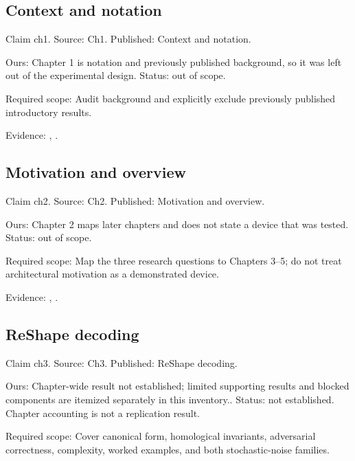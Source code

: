 \subsection{Context and notation}\label{claim:ch1}
Claim ch1. Source: Ch1. Published: Context and notation.

Ours: Chapter 1 is notation and previously published background, so it was left out of the experimental design. Status: out of scope.

Required scope: Audit background and explicitly exclude previously published introductory results.

Evidence: \href{https://github.com/alectionary/vibe-math/blob/master/formalization/quintavalle-hgp/sources/browser-extraction.txt}{}, \href{https://github.com/alectionary/vibe-math/blob/master/formalization/quintavalle-hgp/availability.md}{}.
\subsection{Motivation and overview}\label{claim:ch2}
Claim ch2. Source: Ch2. Published: Motivation and overview.

Ours: Chapter 2 maps later chapters and does not state a device that was tested. Status: out of scope.

Required scope: Map the three research questions to Chapters 3--5; do not treat architectural motivation as a demonstrated device.

Evidence: \href{https://github.com/alectionary/vibe-math/blob/master/formalization/quintavalle-hgp/sources/browser-extraction.txt}{}, \href{https://github.com/alectionary/vibe-math/blob/master/formalization/quintavalle-hgp/availability.md}{}.
\subsection{ReShape decoding}\label{claim:ch3}
Claim ch3. Source: Ch3. Published: ReShape decoding.

Ours: Chapter-wide result not established; limited supporting results and blocked components are itemized separately in this inventory.. Status: not established. Chapter accounting is not a replication result.

Required scope: Cover canonical form, homological invariants, adversarial correctness, complexity, worked examples, and both stochastic-noise families.

